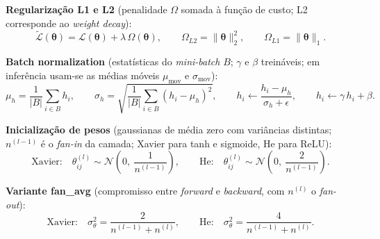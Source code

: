 \documentclass[11pt,a4paper]{article}
\newcommand{\thetav}{\boldsymbol{\theta}}
\begin{document}
\textbf{Regularização L1 e L2} (penalidade $\Omega$ somada à função de custo; L2 corresponde ao \textit{weight decay}):
\[
  \tilde{\mathcal{L}}(\thetav) = \mathcal{L}(\thetav) + \lambda\,\Omega(\thetav),
  \qquad
  \Omega_{L2} = \lVert\thetav\rVert_2^{2},
  \qquad
  \Omega_{L1} = \lVert\thetav\rVert_1.
\]

\textbf{Batch normalization} (estatísticas do \textit{mini-batch} $B$; $\gamma$ e $\beta$ treináveis; em inferência usam-se as médias móveis $\mu_{\text{mov}}$ e $\sigma_{\text{mov}}$):
\[
  \mu_h = \frac{1}{|B|}\sum_{i \in B} h_i,
  \qquad
  \sigma_h = \sqrt{\frac{1}{|B|}\sum_{i \in B} (h_i - \mu_h)^2},
  \qquad
  h_i \leftarrow \frac{h_i - \mu_h}{\sigma_h + \epsilon},
  \qquad
  h_i \leftarrow \gamma\,h_i + \beta.
\]

\textbf{Inicialização de pesos} (gaussianas de média zero com variâncias distintas; $n^{(l-1)}$ é o \textit{fan-in} da camada; Xavier para tanh e sigmoide, He para ReLU):
\[
  \text{Xavier:}\quad \theta^{(l)}_{ij} \sim \mathcal{N}\!\left(0,\ \frac{1}{n^{(l-1)}}\right),
  \qquad
  \text{He:}\quad \theta^{(l)}_{ij} \sim \mathcal{N}\!\left(0,\ \frac{2}{n^{(l-1)}}\right).
\]

\textbf{Variante fan\_avg} (compromisso entre \textit{forward} e \textit{backward}, com $n^{(l)}$ o \textit{fan-out}):
\[
  \text{Xavier:}\quad \sigma_\theta^{2} = \frac{2}{n^{(l-1)} + n^{(l)}},
  \qquad
  \text{He:}\quad \sigma_\theta^{2} = \frac{4}{n^{(l-1)} + n^{(l)}}.
\]
\end{document}
